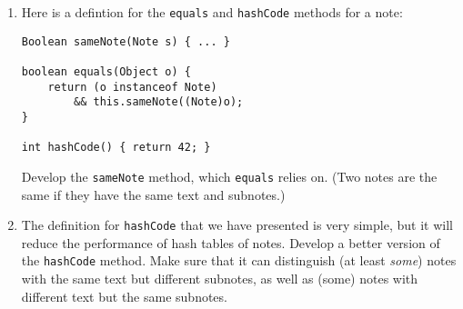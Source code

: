 \documentclass[12pt]{article}                   %
\begin{document}
\begin{problem}
\begin{enumerate}


\ifrubric
\else
{}
\fi
\newpage

\noindent
\item Here is a defintion for the \texttt{equals} and \texttt{hashCode}
methods for a note:

\begin{verbatim}
Boolean sameNote(Note s) { ... }

boolean equals(Object o) {
    return (o instanceof Note) 
        && this.sameNote((Note)o);
}

int hashCode() { return 42; }
\end{verbatim}

\noindent
Develop the \texttt{sameNote} method, which \texttt{equals} relies on.
(Two notes are the same if they have the same text and subnotes.)

\ifrubric
\else
{}
\fi
\newpage

\noindent
\item The definition for \texttt{hashCode} that we have presented is
  very simple, but it will reduce the performance of hash tables of
  notes.  Develop a better version of the \texttt{hashCode} method.
  Make sure that it can distinguish (at least \emph{some}) notes with
  the same text but different subnotes, as well as (some)
  notes with different text but the same subnotes.

\ifrubric
\else
{}
\fi
\newpage
\newpage
\end{enumerate}
\end{problem}


\end{document}

